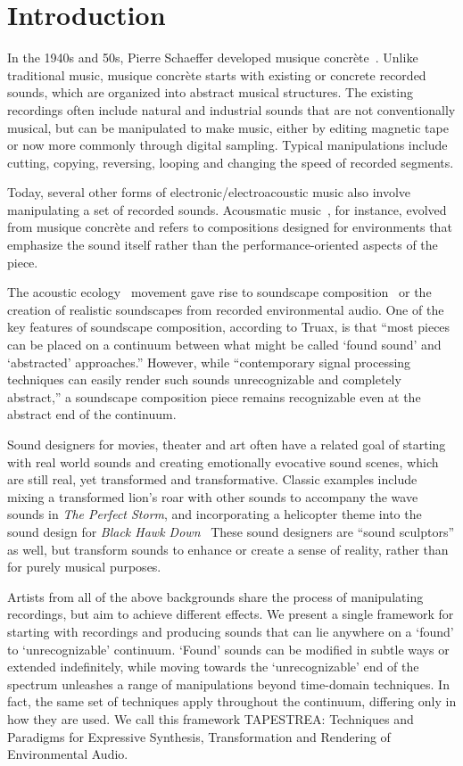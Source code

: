 \documentclass[10pt,letterpaper]{article}
\begin{document}
\section{Introduction}

In the 1940s and 50s, Pierre Schaeffer developed musique
concr\`{e}te~\cite{Schaeffer50,Schaeffer52}.  Unlike traditional music,
musique concr\`ete starts with existing or concrete recorded sounds,
which are organized into abstract musical structures. The existing
recordings often include natural and industrial sounds that are not
conventionally musical, but can be manipulated to make music, either by
editing magnetic tape or now more commonly through digital sampling.
Typical manipulations include cutting, copying, reversing, looping and
changing the speed of recorded segments.

Today, several other forms of electronic/electroacoustic music also
involve manipulating a set of recorded sounds. Acousmatic
music~\cite{Dhomont95}, for instance, evolved from musique concr\`ete
and refers to compositions designed for environments that emphasize the
sound itself rather than the performance-oriented aspects of the piece.

The acoustic ecology~\cite{Schafer77} movement gave rise to soundscape
composition~\cite{Truax96,Truax02} or the creation of realistic
soundscapes from recorded environmental audio. One of the key features
of soundscape composition, according to Truax, is that ``most pieces can
be placed on a continuum between what might be called `found sound' and
`abstracted' approaches.'' However, while ``contemporary signal processing
techniques can easily render such sounds unrecognizable and completely
abstract,'' a soundscape composition piece remains recognizable even at
the abstract end of the continuum.

Sound designers for movies, theater and art often have a related goal of
starting with real world sounds and creating emotionally evocative sound
scenes, which are still real, yet transformed and transformative.
Classic examples include mixing a transformed lion's roar with other
sounds to accompany the wave sounds in \textit{The Perfect Storm}, and
incorporating a helicopter theme into the sound design for \textit{Black
Hawk Down}~\cite{Rudy04} These sound designers are ``sound sculptors''
as well, but transform sounds to enhance or create a sense of reality,
rather than for purely musical purposes.

Artists from all of the above backgrounds share the process
of manipulating recordings, but aim to achieve different
effects. We present a single framework for starting with
recordings and producing sounds that can lie anywhere on a
`found' to `unrecognizable' continuum. `Found' sounds can
be modified in subtle ways or extended indefinitely, while
moving towards the `unrecognizable' end of the spectrum unleashes
a range of manipulations beyond time-domain techniques.
In fact, the same set of techniques apply throughout
the continuum, differing only in how they are used. We call
this framework TAPESTREA: Techniques and Paradigms for
Expressive Synthesis, Transformation and Rendering of Environmental
Audio.
\end{document}
